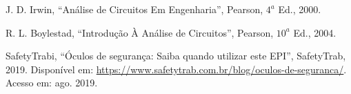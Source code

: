 \documentclass[a4paper,12pt,oneside,openany,table,xcdraw]{article}
\begin{document}
\newpage
\begin{thebibliography}{9} 
    J. D. Irwin,
    “Análise de Circuitos Em Engenharia”, Pearson, $4^a$ Ed., 2000.

    R. L. Boylestad,
    “Introdução À Análise de Circuitos”, Pearson, $10^a$ Ed., 2004.

    SafetyTrabi,
    “Óculos de segurança: Saiba quando utilizar este EPI”, SafetyTrab, 2019.
 Disponível em:
 \url{https://www.safetytrab.com.br/blog/oculos-de-seguranca/}. Acesso em: ago. 2019.


\end{thebibliography}
\end{document}
